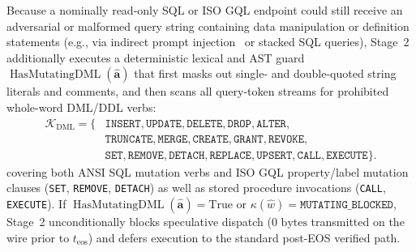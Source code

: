 \documentclass[10pt,conference]{IEEEtran}
\begin{document}
Because a nominally read-only SQL or ISO GQL endpoint could still receive an adversarial or malformed query string containing data manipulation or definition statements (e.g., via indirect prompt injection~\cite{debenedetti2025camel} or stacked SQL queries), Stage~2 additionally executes a deterministic lexical and AST guard $\operatorname{HasMutatingDML}(\hat{\mathbf{a}})$ that first masks out single- and double-quoted string literals and comments, and then scans all query-token streams for prohibited whole-word DML/DDL verbs:
\begin{equation}
\begin{aligned}
\mathcal{K}_{\text{DML}} = \{&\texttt{INSERT}, \texttt{UPDATE}, \texttt{DELETE}, \texttt{DROP}, \texttt{ALTER}, \\
&\texttt{TRUNCATE}, \texttt{MERGE}, \texttt{CREATE}, \texttt{GRANT}, \texttt{REVOKE}, \\
&\texttt{SET}, \texttt{REMOVE}, \texttt{DETACH}, \texttt{REPLACE}, \texttt{UPSERT}, \texttt{CALL}, \texttt{EXECUTE}\}.
\end{aligned}
\label{eq:dml_keywords}
\end{equation}
covering both ANSI SQL mutation verbs and ISO GQL property/label mutation clauses (\texttt{SET}, \texttt{REMOVE}, \texttt{DETACH}) as well as stored procedure invocations (\texttt{CALL}, \texttt{EXECUTE}). If $\operatorname{HasMutatingDML}(\hat{\mathbf{a}}) = \text{True}$ or $\kappa(\hat{w}) = \texttt{MUTATING\_BLOCKED}$, Stage~2 unconditionally blocks speculative dispatch ($0\text{ bytes}$ transmitted on the wire prior to $t_{\text{eos}}$) and defers execution to the standard post-EOS verified path.
\end{document}
